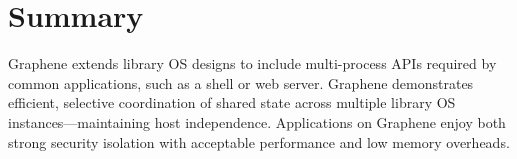 \section{Summary}
\label{sec:graphene:summary}

Graphene extends library OS designs 
to include multi-process APIs required by common applications, such as a shell or 
web server.
Graphene demonstrates efficient, selective
coordination of shared state across multiple library OS 
instances---maintaining host independence.
Applications on Graphene enjoy both 
strong security isolation with acceptable performance and low memory overheads.




